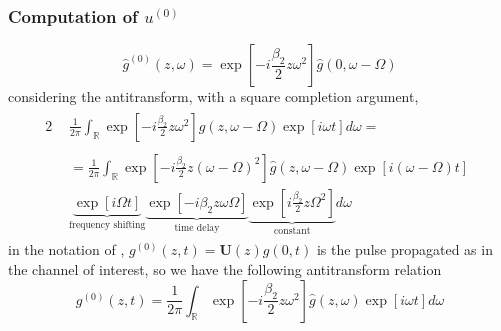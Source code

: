 \documentclass[8pt]{beamer} %
\begin{document}
\begin{frame}
    \frametitle{Computation of $u^{(0)}$}
    \begin{equation}
        \hat{g}^{(0)}(z, \omega) =  \exp \left[- i \frac{\beta_{2}}{2} z \omega^2 \right] \hat{g}(0, \omega - \Omega)
    \end{equation}
    considering the antitransform, with a square completion argument,
    \begin{alignat}{2}
         & \begin{aligned}
               \frac{1}{2\pi} \int_{\mathbb{R}} \exp \left[-i\frac{\beta_2}{2}z \omega^2 \right] \hat{g}(z, \omega - \Omega) \exp \left[i\omega t\right] d\omega =
           \end{aligned}\label{eq:nlA_2}                                             \\
         & \begin{aligned}
               =\frac{1}{2\pi} \int_{\mathbb{R}} \exp \left[-i\frac{\beta_2}{2}z (\omega-\Omega)^2 \right]  \hat{g}(z, \omega - \Omega) \exp \left[i(\omega -\Omega) t\right] \\
               \underbrace{\exp \left[i\Omega t\right]}_{\text{frequency shifting}} \underbrace{\exp \left[- i \beta_2 z \omega \Omega\right]}_{\text{time delay}} \underbrace{\exp\left[i\frac{\beta_2}{2}z \Omega^2 \right]}_{\text{constant}} d\omega
           \end{aligned}\label{eq:nlB_2}
    \end{alignat}
    in the notation of \cite{Dar_2013}, $g^{(0)}(z, t) = \mathbf{U}(z)g(0, t)$ is the pulse propagated as in the channel of interest, so we have the following antitransform relation
    \begin{equation}
        g^{(0)}(z, t) = \frac{1}{2\pi}\int_{\mathbb{R}} \exp \left[-i\frac{\beta_2}{2}z \omega^2 \right]  \hat{g}(z, \omega) \exp\left[i\omega t\right]d\omega
    \end{equation}
\end{frame}
\end{document}
